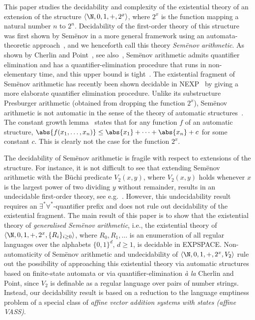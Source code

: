 
This paper studies the decidability and complexity of the existential
theory of an extension of the structure
$\langle \N,0,1,+,2^x \rangle$, where $2^x$ is the function mapping a
natural number $n$ to $2^n$.  Decidability of the first-order theory of
this structure was first shown by Sem{\"e}nov in a more general
framework using an automata-theoretic approach~\cite{Sem80}, and we
henceforth call this theory
\emph{Sem{\"e}nov arithmetic}. As shown by Cherlin and Point~\cite{CP86},
see also~\cite{Point10}, Sem{\"e}nov arithmetic admits quantifier
elimination and has a quantifier-elimination procedure that runs in
non-elementary time, and this upper bound is tight~\cite{Point10}. The
existential fragment of Sem{\"e}nov arithmetic has recently been shown
decidable in NEXP~\cite{BCM23} by giving a more elaborate quantifier
elimination procedure. Unlike its substructure Presburger arithmetic
(obtained from dropping the function $2^x$), Sem{\"e}nov arithmetic is
not automatic in the sense of the theory of automatic
structures~\cite{KN95,BG00}. The constant growth lemma~\cite{KM07}
states that for any function $f$ of an automatic structure,
$\abs{f(x_1,\ldots,x_n)} \le \abs{x_1} + \cdots + \abs{x_n} + c$ for
some constant $c$. This is clearly not the case for the function
$2^x$.

The decidability of Sem{\"e}nov arithmetic is fragile with respect to
extensions of the structure. For instance, it is not difficult to see
that extending Sem{\"e}nov arithmetic with the B\"uchi predicate
$V_2(x,y)$, where $V_2(x,y)$ holds whenever $x$ is the largest power
of two dividing $y$ without remainder, results in an undecidable
first-order theory, see e.g.~\cite{Point10}. However, this
undecidability result requires an $\exists^*\forall^*$-quantifier
prefix and does not rule out decidability of the existential
fragment. The main result of this paper is to show that the
existential theory of \emph{generalised Sem{\"e}nov arithmetic}, i.e.,
the existential theory of $\langle
\N,0,1,+,2^x,\{R_i\}_{i\ge 0} \rangle$, where $R_0,R_1,\ldots$ is an
enumeration of all regular languages over the alphabets $\{0,1\}^d$,
$d\ge 1$, is decidable in EXPSPACE. Non-automaticity of Sem{\"e}nov
arithmetic and undecidability of $\langle \N,0,1,+,2^x,V_2 \rangle$
rule out the possibility of approaching this existential theory via
automatic structures based on finite-state automata or via
quantifier-elimination \emph{\`a la} Cherlin and Point, since $V_2$ is
definable as a regular language over pairs of number strings.
Instead, our decidability result is based on a reduction to the
language emptiness problem of a special class of \emph{affine vector
addition systems with states (affine VASS)}.

